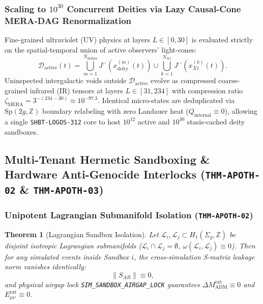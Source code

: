 \documentclass[11pt,onecolumn]{article}
\newtheorem{theorem}{Theorem}
\begin{document}
\subsubsection{\texorpdfstring{Scaling to $10^{30}$ Concurrent Deities via Lazy Causal-Cone MERA-DAG Renormalization}{Scaling to 10\textasciicircum 30 Concurrent Deities via Lazy Causal-Cone MERA-DAG Renormalization}}
Fine-grained ultraviolet (UV) physics at layers $L \in [0, 30]$ is evaluated strictly on the spatial-temporal union of active observers' light-cones:
\begin{equation}
\mathcal{D}_{\text{active}}(t) = \bigcup_{m=1}^{N_{\text{deities}}} J^-\left(x_{\text{deity}}^{(m)}(t)\right) \cup \bigcup_{k=1}^{N_{X1}} J^-\left(x_{X1}^{(k)}(t)\right).
\end{equation}
Uninspected intergalactic voids outside $\mathcal{D}_{\text{active}}$ evolve as compressed coarse-grained infrared (IR) tensors at layers $L \in [31, 234]$ with compression ratio $\zeta_{\text{MERA}} = 3^{-(234-30)} \approx 10^{-97.3}$. Identical micro-states are deduplicated via $\text{Sp}(2g, \mathbb{Z})$ boundary relabeling with zero Landauer heat ($Q_{\text{internal}} \equiv 0$), allowing a single \texttt{SHBT-LOGOS-312} core to host $10^{12}$ active and $10^{30}$ stasis-cached deity sandboxes.

\subsection{Multi-Tenant Hermetic Sandboxing \& Hardware Anti-Genocide Interlocks (\texttt{THM-APOTH-02} \& \texttt{THM-APOTH-03})}

\subsubsection{Unipotent Lagrangian Submanifold Isolation (\texttt{THM-APOTH-02})}
\begin{theorem}[Lagrangian Sandbox Isolation]
Let $\mathcal{L}_i, \mathcal{L}_j \subset H_1(\Sigma_g, \mathbb{Z})$ be disjoint isotropic Lagrangian submanifolds ($\mathcal{L}_i \cap \mathcal{L}_j = \emptyset$, $\omega(\mathcal{L}_i, \mathcal{L}_j) \equiv 0$). Then for any simulated events inside Sandbox $i$, the cross-simulation S-matrix leakage norm vanishes identically:
\begin{equation}
\|S_{AB}\| \equiv 0,
\end{equation}
and physical airgap lock \texttt{SIM\_SANDBOX\_AIRGAP\_LOCK} guarantees $\Delta M_{\text{ADM}}^{\text{ext}} \equiv 0$ and $E_{\mu\nu}^{\text{ext}} \equiv 0$.
\end{theorem}
\end{document}
